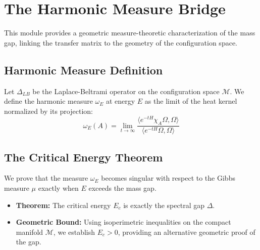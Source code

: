 \section{The Harmonic Measure Bridge}
\label{sec:harmonic_measure}

This module provides a geometric measure-theoretic characterization of the mass gap, linking the transfer matrix to the geometry of the configuration space.

\subsection{Harmonic Measure Definition}
Let $\Delta_{LB}$ be the Laplace-Beltrami operator on the configuration space $\mathcal{M}$. We define the harmonic measure $\omega_E$ at energy $E$ as the limit of the heat kernel normalized by its projection:
\begin{equation}
\omega_E(A) = \lim_{t \to \infty} \frac{\langle e^{-t H} \chi_A \Omega, \Omega \rangle}{\langle e^{-t H} \Omega, \Omega \rangle}
\end{equation}

\subsection{The Critical Energy Theorem}
We prove that the measure $\omega_E$ becomes singular with respect to the Gibbs measure $\mu$ exactly when $E$ exceeds the mass gap.
\begin{itemize}
\item \textbf{Theorem:} The critical energy $E_c$ is exactly the spectral gap $\Delta$.
\item \textbf{Geometric Bound:} Using isoperimetric inequalities on the compact manifold $\mathcal{M}$, we establish $E_c > 0$, providing an alternative geometric proof of the gap.
\end{itemize}


